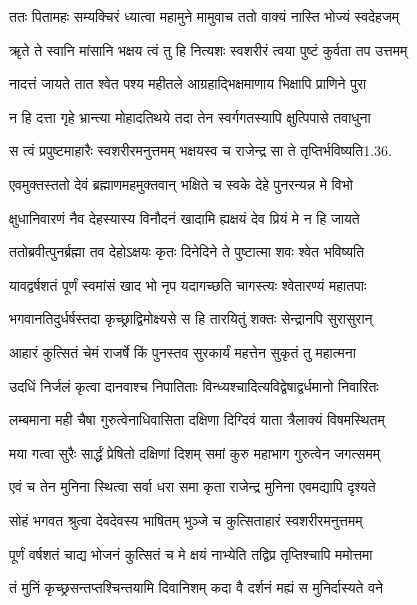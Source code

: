 \twolineshloka
{ततः पितामहः सम्यक्चिरं ध्यात्वा महामुने}
{मामुवाच ततो वाक्यं नास्ति भोज्यं स्वदेहजम्}%

\twolineshloka
{ॠते ते स्वानि मांसानि भक्षय त्वं तु हि नित्यशः}
{स्वशरीरं त्वया पुष्टं कुर्वता तप उत्तमम्}%

\twolineshloka
{नादत्तं जायते तात श्वेत पश्य महीतले}
{आग्रहाद्भिक्षमाणाय भिक्षापि प्राणिने पुरा}%

\twolineshloka
{न हि दत्ता गृहे भ्रान्त्या मोहादतिथये तदा}
{तेन स्वर्गगतस्यापि क्षुत्पिपासे तवाधुना}%

\twolineshloka
{स त्वं प्रपुष्टमाहारैः स्वशरीरमनुत्तमम्}
{भक्षयस्व च राजेन्द्र सा ते तृप्तिर्भविष्यति1.36.}%

\twolineshloka
{एवमुक्तस्ततो देवं ब्रह्माणमहमुक्तवान्}
{भक्षिते च स्वके देहे पुनरन्यन्न मे विभो}%

\twolineshloka
{क्षुधानिवारणं नैव देहस्यास्य विनौदनं}
{खादामि ह्यक्षयं देव प्रियं मे न हि जायते}%

\twolineshloka
{ततोब्रवीत्पुनर्ब्रह्मा तव देहोऽक्षयः कृतः}
{दिनेदिने ते पुष्टात्मा शवः श्वेत भविष्यति}%

\twolineshloka
{यावद्वर्षशतं पूर्णं स्वमांसं खाद भो नृप}
{यदागच्छति चागस्त्यः श्वेतारण्यं महातपाः}%

\twolineshloka
{भगवानतिदुर्धर्षस्तदा कृच्छ्राद्विमोक्ष्यसे}
{स हि तारयितुं शक्तः सेन्द्रानपि सुरासुरान्}%

\twolineshloka
{आहारं कुत्सितं चेमं राजर्षे किं पुनस्तव}
{सुरकार्यं महत्तेन सुकृतं तु महात्मना}%

\twolineshloka
{उदधिं निर्जलं कृत्वा दानवाश्च निपातिताः}
{विन्ध्यश्चादित्यविद्वेषाद्वर्धमानो निवारितः}%

\twolineshloka
{लम्बमाना मही चैषा गुरुत्वेनाधिवासिता}
{दक्षिणा दिग्दिवं याता त्रैलाक्यं विषमस्थितम्}%

\twolineshloka
{मया गत्वा सुरैः सार्द्धं प्रेषितो दक्षिणां दिशम्}
{समां कुरु महाभाग गुरुत्वेन जगत्समम्}%

\twolineshloka
{एवं च तेन मुनिना स्थित्वा सर्वा धरा समा}
{कृता राजेन्द्र मुनिना एवमद्यापि दृश्यते}%

\twolineshloka
{सोहं भगवत श्रुत्वा देवदेवस्य भाषितम्}
{भुञ्जे च कुत्सिताहारं स्वशरीरमनुत्तमम्}%

\twolineshloka
{पूर्णं वर्षशतं चाद्य भोजनं कुत्सितं च मे}
{क्षयं नाभ्येति तद्विप्र तृप्तिश्चापि ममोत्तमा}%

\twolineshloka
{तं मुनिं कृच्छ्रसन्तप्तश्चिन्तयामि दिवानिशम्}
{कदा वै दर्शनं मह्यं स मुनिर्दास्यते वने}%


